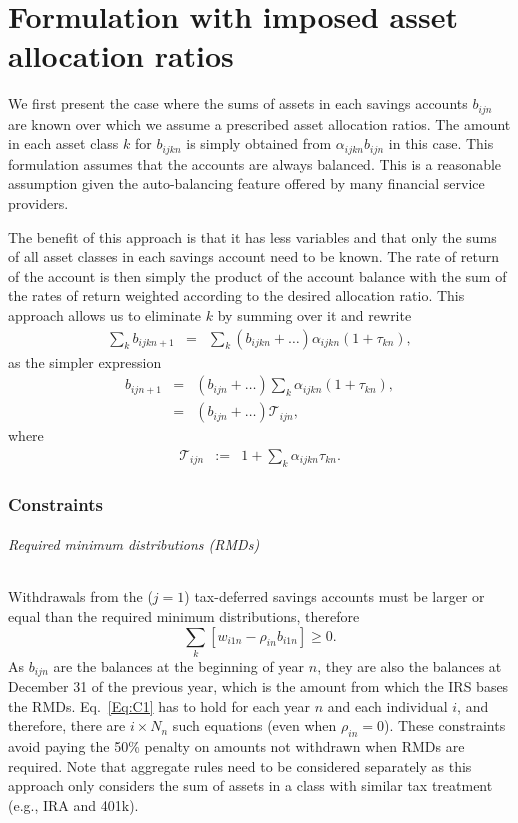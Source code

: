 \documentclass{article}[fleqn,12pt]
\begin{document}
\part{Formulation with imposed asset allocation ratios}
We first present the case where the sums of assets in each savings accounts $b_{ijn}$ are known
over which we assume a prescribed asset allocation ratios.
The amount in each asset class $k$ for $b_{ijkn}$ is simply obtained
from $\alpha_{ijkn} b_{ijn}$ in this case.
This formulation assumes that the accounts are always balanced. This is
a reasonable assumption given the auto-balancing feature offered by many financial service
providers.

The benefit of this approach is that it has less variables and that only the sums of
all asset classes in each savings account need to be known. The rate of return
of the account is then simply the product of the account balance with the sum of
the rates of return weighted according to the desired allocation ratio.
This approach allows us to eliminate $k$ by summing over it and rewrite
\begin{eqnarray}
	\sum_k b_{ijkn+1} &=& \sum_k (b_{ijkn} + \ldots ) \alpha_{ijkn} (1 + \tau_{kn}) ,
\end{eqnarray}
as the simpler expression 
\begin{eqnarray}
	b_{ijn+1} &=& (b_{ijn} + \ldots ) \sum_k \alpha_{ijkn} (1 + \tau_{kn}) ,\nonumber \\
		  &=& (b_{ijn} + \ldots ) \mathcal{T}_{ijn},
\end{eqnarray}
where
\begin{eqnarray}
	\label{Eq:Tau1}
	\mathcal{T}_{ijn} &:=& 1 + \sum_k \alpha_{ijkn} \tau_{kn}.
\end{eqnarray}

\section{Constraints}
\paragraph*{Required minimum distributions (RMDs)}
	Withdrawals from the ($j=1$) tax-deferred savings accounts must be larger
	or equal than the required minimum distributions, therefore
	\begin{equation}
		\label{Eq:C1}
		\sum_k [w_{i1n} -  \rho_{in}b_{i1n}] \geq 0.
	\end{equation}
	As $b_{ijn}$ are the balances at the beginning of year $n$, they are also the balances
	at December 31 of the previous year, which is the amount from which the IRS bases the RMDs.
	Eq.~\ref{Eq:C1} has to hold for each year $n$ and each individual $i$, and therefore, there
	are $i\times N_n$ such equations (even when $\rho_{in} = 0$).
	These constraints avoid paying the 50\% penalty
	on amounts not withdrawn when RMDs are required.
	Note that aggregate rules need to be considered separately as this approach only considers
	the sum of assets in a class with similar tax treatment (e.g., IRA and 401k).
\end{document}
